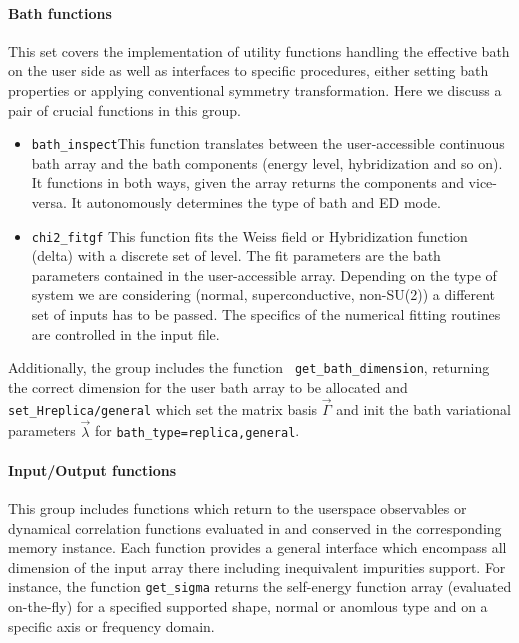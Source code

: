 \documentclass[edipack2.tex]{subfiles}
\begin{document}
\paragraph{{\bf Bath functions}}
This set covers the implementation of utility functions handling the
effective bath on the user side as well as interfaces to specific
\NAME procedures, either setting bath properties or applying
conventional symmetry transformation. Here we discuss 
a pair of crucial functions in this group.
\begin{itemize}
\item {\tt bath\_inspect}This function translates between the
  user-accessible continuous bath array and the bath components
  (energy level, hybridization and so on). It functions in both ways,
  given the array returns the components and vice-versa. It
  autonomously determines the type of bath and ED mode.

\item {\tt chi2\_fitgf}
  This function fits the Weiss field or Hybridization function (delta)
  with a discrete set of level. The fit parameters are the bath
  parameters contained in the user-accessible array. Depending on the
  type of system we are considering (normal, superconductive,
  non-SU(2)) a different set of inputs has to be passed. The specifics
  of the numerical fitting routines are controlled in the input file.
  \end{itemize}

Additionally, the group includes the function {\tt
  get\_bath\_dimension}, returning the correct
dimension for the user bath array to be allocated and {\tt
  set\_H{replica/general}} which set the matrix basis
$\vec{\Gamma}$ and init the bath variational parameters
$\vec{\lambda}$ for {\tt bath\_type=replica,general}. 




  
\paragraph{{\bf Input/Output functions}}
This group includes functions which return to the userspace
observables or dynamical correlation functions evaluated in \NAME and
conserved in the corresponding memory instance. Each function
provides a general interface which encompass all dimension of the
input array there including inequivalent impurities support.
For instance, the function {\tt get\_sigma} returns the self-energy
function array (evaluated on-the-fly) for a specified supported shape,
normal or anomlous type and on a specific axis or frequency domain. 
    
\end{document}
